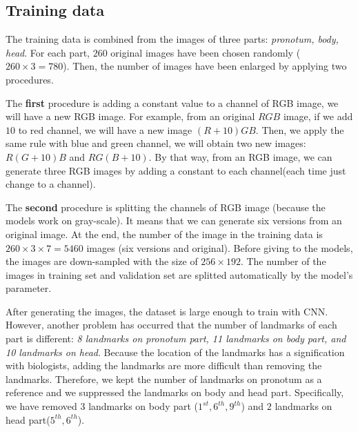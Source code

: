 \documentclass[12pt,a4paper]{article}
\begin{document}
\subsection{Training data}
The training data is combined from the images of three parts: \textit{pronotum, body, head}. For each part, $260$ original images have been chosen randomly ($260 \times 3 = 780$). Then, the number of images have been enlarged by applying two procedures. 

The \textbf{first} procedure is adding a constant value to a channel of RGB image, we will have a new RGB image. For example, from an original $RGB$ image, if we add $10$ to red channel, we will have a new image $(R+10)GB$. Then, we apply the same rule with blue and green channel, we will obtain two new images: $R(G+10)B$ and $RG(B+10)$. By that way, from an RGB image, we can generate three RGB images by adding a constant to each channel(each time just change to a channel). 

The \textbf{second} procedure is splitting the channels of RGB image (because the models work on gray-scale). It means that we can generate six versions from an original image. At the end, the number of the image in the training data is $ 260 \times 3 \times 7 = 5460$ images (six versions and original). Before giving to the models, the images are down-sampled with the size of $256 \times 192$. The number of the images in training set and validation set are splitted automatically by the model's parameter.

After generating the images, the dataset is large enough to train with CNN. However, another problem has occurred that the number of landmarks of each part is different: \textit{8 landmarks on pronotum part, 11 landmarks on body part, and 10 landmarks on head}. Because the location of the landmarks has a signification with biologists, adding the landmarks are more difficult than removing the landmarks. Therefore, we kept the number of landmarks on pronotum as a reference and we suppressed the landmarks on body and head part. Specifically, we have removed $3$ landmarks on body part ($1^{st}, 6^{th}, 9^{th}$) and $2$ landmarks on head part($5^{th}, 6^{th}$).
\end{document}

